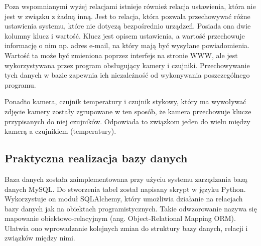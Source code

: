 \documentclass[a4paper,12pt,twoside]{article}
\begin{document}
Poza wspomnianymi wyżej relacjami istnieje również relacja ustawienia, która nie jest w związku z żadną inną. Jest to relacja, która pozwala przechowywać różne ustawienia systemu, które nie dotyczą bezpośrednio urządzeń. Posiada ona dwie kolumny klucz i wartość. Klucz jest opisem ustawienia, a wartość przechowuje informację o nim np. adres e-mail, na który mają być wysyłane powiadomienia. Wartość ta może być zmieniona poprzez interfejs na stronie WWW, ale jest wykorzystywana przez program obsługujący kamery i czujniki. Przechowywanie tych danych w bazie zapewnia ich niezależność od wykonywania poszczególnego programu.

Ponadto kamera, czujnik temperatury i czujnik stykowy, który ma wywoływać zdjęcie kamery zostały zgrupowane w ten sposób, że kamera przechowuje klucze przypisanych do niej czujników. Odpowiada to związkom jeden do wielu między kamerą a czujnikiem (temperatury).

\subsection{Praktyczna realizacja bazy danych}
Baza danych została zaimplementowana przy użyciu systemu zarządzania bazą danych MySQL. Do stworzenia tabel został napisany skrypt w języku Python. Wykorzystuje on moduł SQLAlchemy, który umożliwia działanie na relacjach bazy danych jak na obiektach programistycznych. Takie odwzorowanie nazywa się mapowanie obiektowo-relacyjnym (ang. Object-Relational Mapping ORM). Ułatwia ono wprowadzanie kolejnych zmian do struktury bazy danych, relacji i związków między nimi.
\end{document}
